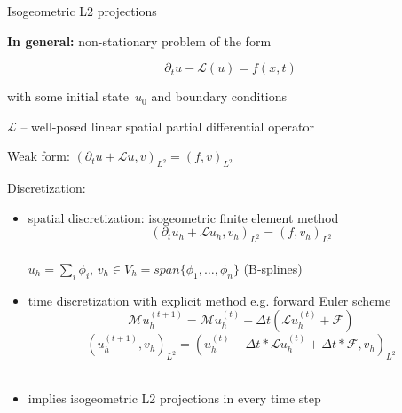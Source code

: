 \documentclass[c]{beamer}
\newcommand{\Prod}[2]{(#1, #2)_{L^2}}
\begin{document}

\begin{frame}{Isogeometric L2 projections}


\textbf{In general:} non-stationary problem of the form

\begin{equation*}
  \partial_t u - \mathcal{L}(u) = f(x, t)
\end{equation*}

with some initial state~$u_0$ and boundary conditions
\vspace{2mm}

$\mathcal{L}$ -- well-posed linear spatial partial differential operator

Weak form:
  $\Prod{\partial_t u + \mathcal{L}u}{v} = \Prod{f}{v}$

\vspace{3mm}

Discretization:
\begin{itemize}
  \item spatial discretization: isogeometric finite element method
  \begin{equation*}
  \Prod{\partial_t u_h + \mathcal{L}u_h}{v_h} = \Prod{f}{v_h}
  \end{equation*}
  \\\vspace{2mm}
  $u_h = \sum_i \phi_i$, $v_h\in V_h=span\{\phi_1,\ldots,\phi_n\}$ (B-splines)
  \\\vspace{2mm}
  \item time discretization with explicit method 
  e.g. forward Euler scheme
  \begin{equation*}
   \mathcal{M} u_h^{(t + 1)} =
   \mathcal{M} u_h^{(t)} +
   \Delta t \left(\mathcal{L}u_h^{(t)} + \mathcal{F}\right)
\end{equation*}
\begin{equation*}
  \Prod{u_h^{(t+1)}}{v_h} =  \Prod{u_{h}^{(t)}- \Delta t * \mathcal{L}u_h^{(t)} +\Delta t * \mathcal{F}}{v_h} 
\end{equation*}
  \\\vspace{2mm}
  \item   implies isogeometric L2 projections in every time step 
  
\end{itemize}

\end{frame}
\end{document}
